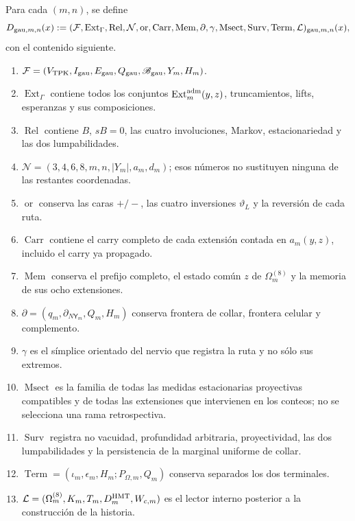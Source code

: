 Para cada \((m,n)\), se define
\begin{equation}\label{eq:gauint-d-trece}
 D_{{\rm gau},m,n}(x):=
 (\mathcal F,\operatorname{Ext}_\Gamma,\operatorname{Rel},
 \mathcal N,\operatorname{or},\operatorname{Carr},\operatorname{Mem},
 \partial,\gamma,\operatorname{Msect},\operatorname{Surv},
 \operatorname{Term},\mathcal L)_{{\rm gau},m,n}(x),
\end{equation}
con el contenido siguiente.
\begin{enumerate}
 \item \(\mathcal F=(V_{\rm TPK},I_{\rm gau},E_{\rm gau},
 Q_{\rm gau},\mathscr B_{\rm gau},Y_m,H_m)\).
 \item \(\operatorname{Ext}_\Gamma\) contiene todos los conjuntos
 \(\operatorname{Ext}^{\rm adm}_m(y,z)\), truncamientos, lifts,
 esperanzas y sus composiciones.
 \item \(\operatorname{Rel}\) contiene \(B\), \(sB=0\), las cuatro
 involuciones, Markov, estacionariedad y las dos lumpabilidades.
 \item \(\mathcal N=(3,4,6,8,m,n,|Y_m|,a_m,d_m)\); esos números no
 sustituyen ninguna de las restantes coordenadas.
 \item \(\operatorname{or}\) conserva las caras \(+/-\), las cuatro
 inversiones \(\vartheta_L\) y la reversión de cada ruta.
 \item \(\operatorname{Carr}\) contiene el carry completo de cada
 extensión contada en \(a_m(y,z)\), incluido el carry ya propagado.
 \item \(\operatorname{Mem}\) conserva el prefijo completo, el estado
 común \(z\) de \(\Omega_m^{(8)}\) y la memoria de sus ocho extensiones.
 \item \(\partial=(q_m,\partial_{N\mathsf Y_m},Q_m,H_m)\) conserva
 frontera de collar, frontera celular y complemento.
 \item \(\gamma\) es el símplice orientado del nervio que registra la ruta
 y no sólo sus extremos.
 \item \(\operatorname{Msect}\) es la familia de todas las medidas
 estacionarias proyectivas compatibles y de todas las extensiones que
 intervienen en los conteos; no se selecciona una rama retrospectiva.
 \item \(\operatorname{Surv}\) registra no vacuidad, profundidad
 arbitraria, proyectividad, las dos lumpabilidades y la persistencia de la
 marginal uniforme de collar.
 \item \(\operatorname{Term}=(\iota_m,\epsilon_m,H_m;
 P_{\Omega,m},Q_m)\) conserva separados los dos terminales.
 \item \(\mathcal L=(\Omega_m^{(8)},K_m,T_m,D_m^{\rm HMT},W_{c,m})\)
 es el lector interno posterior a la construcción de la historia.
\end{enumerate}

